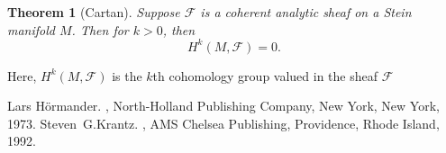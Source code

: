 \documentclass[12pt]{article}
\theoremstyle{theorem}
\newtheorem*{thm}{Theorem}
\theoremstyle{definition}
\theoremstyle{remark}
\begin{document}
\begin{thm}[Cartan]
Suppose $\mathcal{F}$ is a coherent analytic sheaf on a Stein
manifold $M$.
Then for $k > 0$, then 
\begin{equation*}
H^k(M,\mathcal{F}) = 0 .
\end{equation*}
\end{thm}

Here, $H^k(M,\mathcal{F})$ is the $k$th cohomology group valued in the sheaf
$\mathcal{F}$

\begin{thebibliography}{9}
Lars H\"ormander.
{\em {}},
North-Holland Publishing Company, New York, New York, 1973.
Steven~G.\@ Krantz.
{\em {}},
AMS Chelsea Publishing, Providence, Rhode Island, 1992.
\end{thebibliography}
\end{document}
